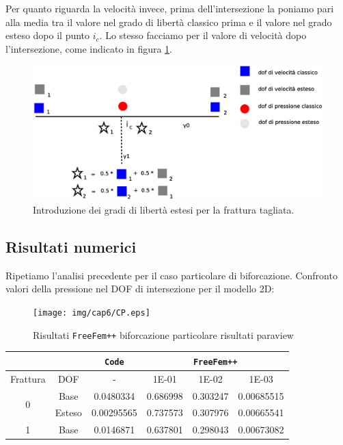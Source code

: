 \noindent Per quanto riguarda la velocità invece, prima dell'intersezione la poniamo pari alla media tra il valore nel grado di libertà classico prima e il valore nel grado esteso dopo il punto $i_c$. Lo stesso facciamo per il valore di velocità dopo l'intersezione, come indicato in figura \ref{xfem}. \\

\newpage
\begin{figure}[htbp]
\begin{center}
\includegraphics[width=1\textwidth]{img/cap6/xfem.eps}
\caption{Introduzione dei gradi di libertà estesi per la frattura tagliata.}\label{xfem}
\end{center}
\end{figure}

\subsection{Risultati numerici}
Ripetiamo l'analisi precedente per il caso particolare di biforcazione. Confronto valori della pressione nel DOF di intersezione per il modello 2D:\\
\begin{figure}[h!]
\centering
\texttt{[image: img/cap6/CP.eps]}
\caption{Risultati \texttt{FreeFem++} biforcazione particolare risultati paraview }\label{CPParaview}
\end{figure}

\begin{center}
\begin{tabular}{|c|c|c|c|c|c|}
\hline
  & & \textbf{\texttt{Code}} & \multicolumn{3}{|c|}{\textbf{\texttt{FreeFem++}}} \\
\hline
\multicolumn{1}{|c|}{Frattura} & DOF & - &
\multicolumn{1}{|c|}{1E-01} & 1E-02 & 1E-03 \\
\hline
\multirow{2}{*}{0} & Base & 0.0480334 & 0.686998 & 0.303247 & 0.00685515\\
\cline{2-6}
& Esteso & 0.00295565 & 0.737573 & 0.307976 & 0.00665541\\
\hline
 1 & Base & 0.0146871 & 0.637801 & 0.298043 & 0.00673082\\
\hline
\end{tabular}
\end{center}

